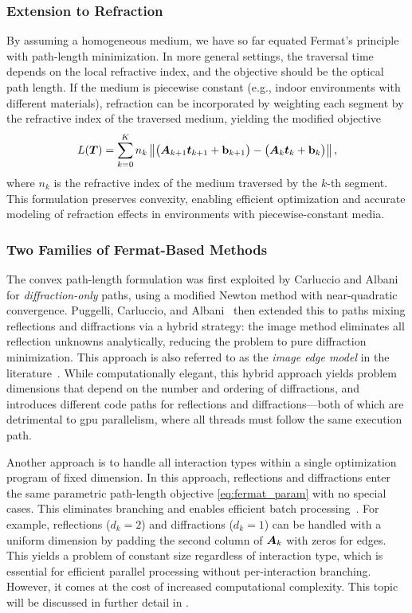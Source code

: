 \subsubsection{Extension to Refraction}

By assuming a homogeneous medium, we have so far equated Fermat's principle with path-length minimization. In more general settings, the traversal time depends on the local refractive index, and the objective should be the optical path length. If the medium is piecewise constant (e.g., indoor environments with different materials), refraction can be incorporated by weighting each segment by the refractive index of the traversed medium, yielding the modified objective
\begin{equation}
  L(\boldsymbol{T}) = \sum_{k=0}^{K} n_k \left\|\bigl(\boldsymbol{A}_{k+1}\boldsymbol{t}_{k+1} + \mathbf{b}_{k+1}\bigr) - \bigl(\boldsymbol{A}_{k}\boldsymbol{t}_{k} + \mathbf{b}_{k}\bigr)\right\|,
\end{equation}
where $n_k$ is the refractive index of the medium traversed by the $k$-th segment. This formulation preserves convexity, enabling efficient optimization and accurate modeling of refraction effects in environments with piecewise-constant media.

\subsubsection{Two Families of Fermat-Based Methods}

The convex path-length formulation was first exploited by Carluccio and Albani~ for \emph{diffraction-only} paths, using a modified Newton method with near-quadratic convergence. Puggelli, Carluccio, and Albani~ then extended this to paths mixing reflections and diffractions via a hybrid strategy: the image method eliminates all reflection unknowns analytically, reducing the problem to pure diffraction minimization. This approach is also referred to as the \emph{image edge model} in the literature~. While computationally elegant, this hybrid approach yields problem dimensions that depend on the number and ordering of diffractions, and introduces different code paths for reflections and diffractions---both of which are detrimental to \gls{gpu} parallelism, where all threads must follow the same execution path.

Another approach is to handle all interaction types within a single optimization program of fixed dimension. In this approach, reflections and diffractions enter the same parametric path-length objective \eqref{eq:fermat_param} with no special cases. This eliminates branching and enables efficient batch processing~. For example, reflections ($d_k=2$) and diffractions ($d_k=1$) can be handled with a uniform dimension by padding the second column of $\boldsymbol{A}_k$ with zeros for edges. This yields a problem of constant size regardless of interaction type, which is essential for efficient parallel processing without per-interaction branching. However, it comes at the cost of increased computational complexity. This topic will be discussed in further detail in .

